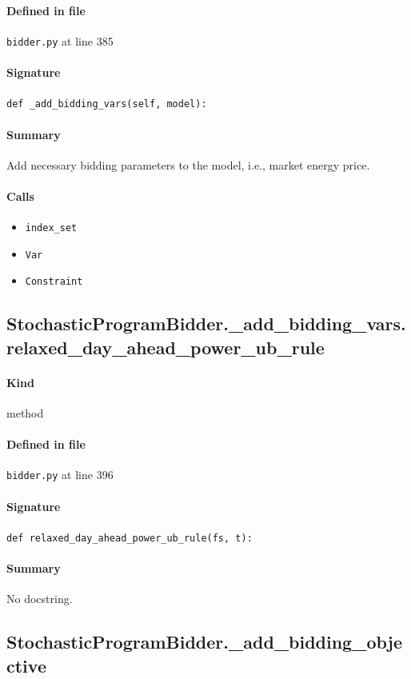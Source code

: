 \documentclass[11pt]{report}
\begin{document}
\paragraph{Defined in file} \texttt{bidder.py} at line 385
\paragraph{Signature} \texttt{def \_add\_bidding\_vars(self, model):}
\paragraph{Summary} Add necessary bidding parameters to the model, i.e., market energy price.
\paragraph{Calls}
\begin{itemize}[leftmargin=*]
  \item \texttt{index\_set}
  \item \texttt{Var}
  \item \texttt{Constraint}
\end{itemize}
\subsection{StochasticProgramBidder.\_add\_bidding\_vars.relaxed\_day\_ahead\_power\_ub\_rule}
\label{def:bidder.py:StochasticProgramBidder._add_bidding_vars.relaxed_day_ahead_power_ub_rule:L396}
\paragraph{Kind} method
\paragraph{Defined in file} \texttt{bidder.py} at line 396
\paragraph{Signature} \texttt{def relaxed\_day\_ahead\_power\_ub\_rule(fs, t):}
\paragraph{Summary} No docstring.
\subsection{StochasticProgramBidder.\_add\_bidding\_objective}
\label{def:bidder.py:StochasticProgramBidder._add_bidding_objective:L418}
\end{document}
